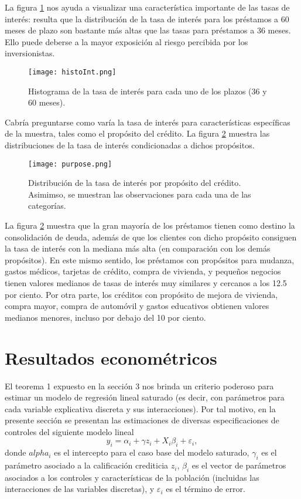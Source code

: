 \documentclass[12pt, fleqn, letterpaper, oneside]{amsart}
\begin{document}
La figura \ref{interest-histo} nos ayuda a visualizar una característica importante de las tasas de interés: resulta que la distribución de la tasa de interés para los préstamos a 60 meses de plazo son bastante más altas que las tasas para préstamos a 36 meses. Ello puede deberse a la mayor exposición al riesgo percibida por los inversionistas. 

\begin{figure}[h!]
	\texttt{[image: histoInt.png]}
	\caption{Histograma de la tasa de interés para cada uno de los plazos (36 y 60 meses). \label{interest-histo}}
\end{figure}

Cabría preguntarse como varía la tasa de interés para características específicas de la muestra, tales como el propósito del crédito. La figura \ref{purpose} muestra las distribuciones de la tasa de interés condicionadas a dichos propósitos.

\begin{figure}[h!]
	\texttt{[image: purpose.png]}
	\caption{Distribución de la tasa de interés por propósito del crédito. Asimimso, se muestran las observaciones para cada una de las categorías. \label{purpose}}
\end{figure}

La figura \ref{purpose} muestra que la gran mayoría de los préstamos tienen como destino la consolidación de deuda, además de que los clientes con dicho propósito consiguen la tasa de interés con la mediana más alta (en comparación con los demás propósitos). En este mismo sentido, los préstamos con propósitos para mudanza, gastos médicos, tarjetas de crédito, compra de vivienda, y pequeños negocios tienen valores medianos de tasas de interés muy similares y cercanos a los 12.5 por ciento. Por otra parte, los créditos con propósito de mejora de vivienda, compra mayor, compra de automóvil y gastos educativos obtienen valores medianos menores, incluso por debajo del 10 por ciento. 

\section{Resultados econométricos}
El teorema 1 expuesto en la sección 3 nos brinda un criterio poderoso para estimar un modelo de regresión lineal saturado (es decir, con parámetros para cada variable explicativa discreta y sus interacciones). Por tal motivo, en la presente sección se presentan las estimaciones de diversas especificaciones de controles del siguiente modelo lineal
\begin{equation}
y_i = \alpha_i + \gamma z_i + X_i \beta_i + \varepsilon_i, 
\end{equation} 
donde $alpha_i$ es el intercepto para el caso base del modelo saturado, $\gamma_i$ es el parámetro asociado a la calificación crediticia $z_i$, $\beta_i$ es el vector de parámetros asociados a los controles y características de la población (incluidas las interacciones de las variables discretas), y $\varepsilon_i$ es el término de error. 
\end{document}
